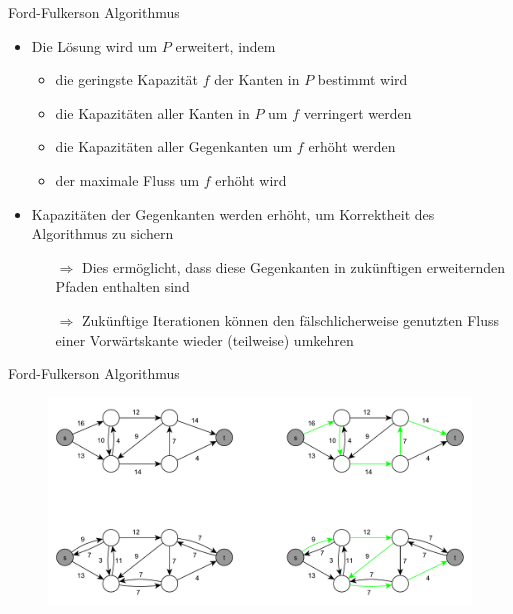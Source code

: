 \documentclass[18pt]{beamer}
\begin{document}
\begin{frame}{Ford-Fulkerson Algorithmus}
\begin{itemize}
	\item Die L\"osung wird um $P$ erweitert, indem
	\begin{itemize}
		\pause
		\item die geringste Kapazit\"at $f$ der Kanten in $P$ bestimmt wird
		\pause
		\item die Kapazit\"aten aller Kanten in $P$ um $f$ verringert werden
		\pause
		\item die Kapazit\"aten aller Gegenkanten um $f$ erh\"oht werden
		\pause
		\item der maximale Fluss um $f$ erh\"oht wird
	\end{itemize}  
	\pause
	\item Kapazit\"aten der Gegenkanten werden erh\"oht, um Korrektheit des Algorithmus zu sichern
	\pause
	\begin{itemize}
		\item[$\Rightarrow$] Dies erm\"oglicht, dass diese Gegenkanten in zuk\"unftigen erweiternden Pfaden enthalten sind
		\pause
		\item[$\Rightarrow$] Zuk\"unftige Iterationen k\"onnen den f\"alschlicherweise genutzten Fluss einer Vorw\"artskante wieder (teilweise) umkehren
	\end{itemize}
\end{itemize}
\end{frame}

\begin{frame}{Ford-Fulkerson Algorithmus}
\begin{figure}
\includegraphics[width = \textwidth]{img/Jakob_Ford.pdf}
\end{figure}
\end{frame}
\end{document}
